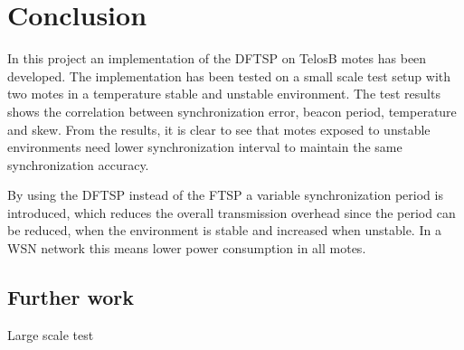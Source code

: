 \documentclass[Main]{subfiles}
\begin{document}
\section{Conclusion} %
\label{sec:conclusion}
	In this project an implementation of the DFTSP on TelosB motes has been developed. 
	The implementation has been tested on a small scale test setup with two motes in a temperature stable and unstable environment. 
	The test results shows the correlation between synchronization error, beacon period, temperature and skew.
	From the results, it is clear to see that motes exposed to unstable environments need lower synchronization interval to maintain the same synchronization accuracy.

	By using the DFTSP instead of the FTSP a variable synchronization period is introduced, which reduces the overall transmission overhead since the period can be reduced, when the environment is stable and increased when unstable.
	In a WSN network this means lower power consumption in all motes.

	\subsection{Further work} %
	\label{sub:further_work}
		Large scale test



\end{document}
